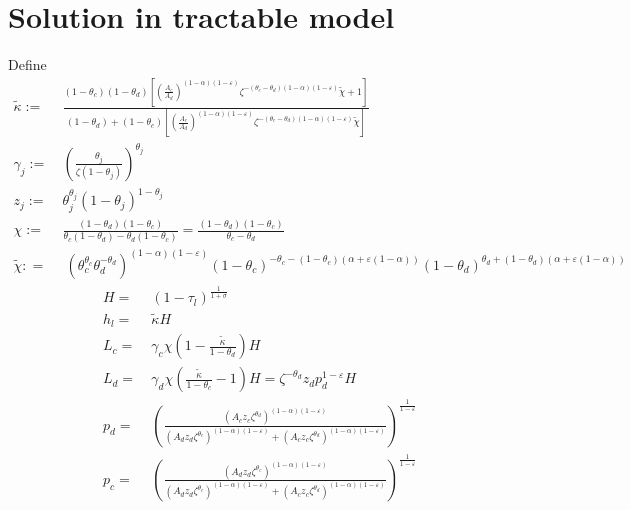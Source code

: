 \section{Solution in tractable model}
Define
\begin{align*}
\tilde{\kappa}:=\ &\frac{(1-\theta_c)(1-\theta_d)\left[\left(\frac{A_c}{A_d}\right)^{(1-\alpha)(1-\varepsilon)}\zeta^{-(\theta_c-\theta_d)(1-\alpha)(1-\varepsilon)}\tilde{\chi}+1\right]}{(1-\theta_d)+(1-\theta_c)\left[\left(\frac{A_c}{A_d}\right)^{(1-\alpha)(1-\varepsilon)}\zeta^{-(\theta_c-\theta_d)(1-\alpha)(1-\varepsilon)}\tilde{\chi}\right]}\\
\gamma_j:=\ & \left(\frac{\theta_j}{\zeta(1-\theta_j)}\right)^{\theta_j}\\
z_j:=\ &\theta_j^{\theta_j}(1-\theta_j)^{1-\theta_j} \\
\chi:=\ & \frac{(1-\theta_d)(1-\theta_c)}{\theta_c(1-\theta_d)-\theta_d(1-\theta_c)}=\frac{(1-\theta_d)(1-\theta_c)}{\theta_c-\theta_d}\\
 \tilde{\chi}: = &\  (\theta_c^{\theta_c}\theta_d^{-\theta_d})^{(1-\alpha) (1-\varepsilon)}(1-\theta_c)^{-\theta_c-(1-\theta_c)(\alpha+\varepsilon(1-\alpha))}(1-\theta_d)^{\theta_d+(1-\theta_d)(\alpha+\varepsilon(1-\alpha))}
\end{align*}
\begin{align*}
H=\ & (1-\tau_l)^{\frac{1}{1+\sigma}}\\
h_l=\ & \tilde{\kappa}H\\
L_c=\ & \gamma_c \chi \left(1-\frac{\tilde{\kappa}}{1-\theta_d}\right)H
\\
L_d=\ & \gamma_d \chi \left(\frac{\tilde{\kappa}}{1-\theta_c}-1\right)H%
=\zeta^{-\theta_d}z_dp_d^{1-\varepsilon}H\\
p_d=\ &\left(\frac{\left(A_cz_c\zeta^{\theta_d}\right)^{(1-\alpha)(1-\varepsilon)}}{\left(A_dz_d\zeta^{\theta_c}\right)^{(1-\alpha)(1-\varepsilon)}+\left(A_cz_c\zeta^{\theta_d}\right)^{(1-\alpha)(1-\varepsilon)}}\right)^{\frac{1}{1-\varepsilon}} \\
p_c=\ & \left(\frac{\left(A_dz_d\zeta^{\theta_c}\right)^{(1-\alpha)(1-\varepsilon)}}{\left(A_dz_d\zeta^{\theta_c}\right)^{(1-\alpha)(1-\varepsilon)}+\left(A_cz_c\zeta^{\theta_d}\right)^{(1-\alpha)(1-\varepsilon)}}\right)^{\frac{1}{1-\varepsilon}}
\end{align*}

